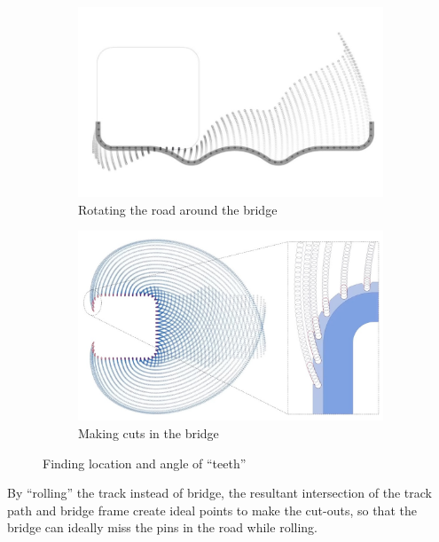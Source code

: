 \documentclass[12pt]{article}
\begin{document}
        \begin{figure}[H]
            \centering
            \begin{subfigure}{0.49\textwidth}
            \centering
            \includegraphics[width = \textwidth]{images/bridge_teeth_1.jpg}
            \caption{Rotating the road around the bridge}\label{fig:teeth1}
            \end{subfigure}
            \begin{subfigure}{0.49\textwidth}
            \centering
            \includegraphics[width = \textwidth]{images/bridge_teeth_2.jpg}
            \caption{Making cuts in the bridge}\label{fig:teeth2}
            \end{subfigure}

            \caption{Finding location and angle of ``teeth''\cite{parker.2023}}
        \end{figure}
     
        By ``rolling'' the track instead of bridge, the resultant intersection of the track path and bridge frame create ideal points to make the cut-outs, so that the bridge can ideally miss the pins in the road while rolling.
        
\end{document}
